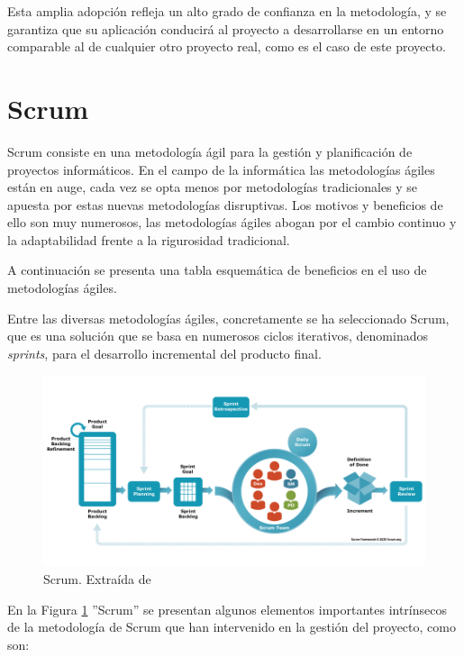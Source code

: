 Esta amplia adopción refleja un alto grado de confianza en la metodología, y se garantiza que su aplicación conducirá al proyecto a desarrollarse en un entorno comparable al de cualquier otro proyecto real, como es el caso de este proyecto.

\section{Scrum} \label{sec:04crum} %

Scrum \cite{scrumWebsite} consiste en una metodología ágil para la gestión y planificación de proyectos informáticos. En el campo de la informática las metodologías ágiles están en auge, cada vez se opta menos por metodologías tradicionales y se apuesta por estas nuevas metodologías disruptivas. Los motivos y beneficios de ello son muy numerosos, las metodologías ágiles abogan por el cambio continuo y la adaptabilidad frente a la rigurosidad tradicional. 

A continuación se presenta una tabla esquemática de beneficios en el uso de metodologías ágiles.



Entre las diversas metodologías ágiles, concretamente se ha seleccionado Scrum, que es una solución que se basa en numerosos ciclos iterativos, denominados \textit{sprints}, para el desarrollo incremental del producto final.

\begin{figure}[H]
    \centering
    \includegraphics[width=1\textwidth]{figures/scrumFramework.png}
     \caption{Scrum. Extraída de \cite{scrumWebsite}}
    \label{fig:scrumFramework}
\end{figure}

En la Figura \ref{fig:scrumFramework} ''Scrum'' se presentan algunos elementos importantes intrínsecos de la metodología de Scrum que han intervenido en la gestión del proyecto, como son:

